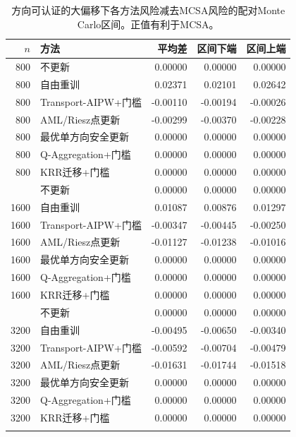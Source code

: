 \begin{table}[ht]
\centering\scriptsize
\caption{方向可认证的大偏移下各方法风险减去MCSA风险的配对Monte Carlo区间。正值有利于MCSA。}
\label{tab:paired-mcsa}
\begin{tabular}{rlrrr}
\toprule
$n$ & 方法 & 平均差 & 区间下端 & 区间上端\\
\midrule
800 & 不更新 & 0.00000 & 0.00000 & 0.00000\\
800 & 自由重训 & 0.02371 & 0.02101 & 0.02642\\
800 & Transport-AIPW+门槛 & -0.00110 & -0.00194 & -0.00026\\
800 & AML/Riesz点更新 & -0.00299 & -0.00370 & -0.00228\\
800 & 最优单方向安全更新 & 0.00000 & 0.00000 & 0.00000\\
800 & Q-Aggregation+门槛 & 0.00000 & 0.00000 & 0.00000\\
800 & KRR迁移+门槛 & 0.00000 & 0.00000 & 0.00000\\
\addlinespace
1600 & 不更新 & 0.00000 & 0.00000 & 0.00000\\
1600 & 自由重训 & 0.01087 & 0.00876 & 0.01297\\
1600 & Transport-AIPW+门槛 & -0.00347 & -0.00445 & -0.00250\\
1600 & AML/Riesz点更新 & -0.01127 & -0.01238 & -0.01016\\
1600 & 最优单方向安全更新 & 0.00000 & 0.00000 & 0.00000\\
1600 & Q-Aggregation+门槛 & 0.00000 & 0.00000 & 0.00000\\
1600 & KRR迁移+门槛 & 0.00000 & 0.00000 & 0.00000\\
\addlinespace
3200 & 不更新 & 0.00000 & 0.00000 & 0.00000\\
3200 & 自由重训 & -0.00495 & -0.00650 & -0.00340\\
3200 & Transport-AIPW+门槛 & -0.00592 & -0.00704 & -0.00479\\
3200 & AML/Riesz点更新 & -0.01631 & -0.01744 & -0.01518\\
3200 & 最优单方向安全更新 & 0.00000 & 0.00000 & 0.00000\\
3200 & Q-Aggregation+门槛 & 0.00000 & 0.00000 & 0.00000\\
3200 & KRR迁移+门槛 & 0.00000 & 0.00000 & 0.00000\\
\addlinespace
\bottomrule
\end{tabular}
\end{table}